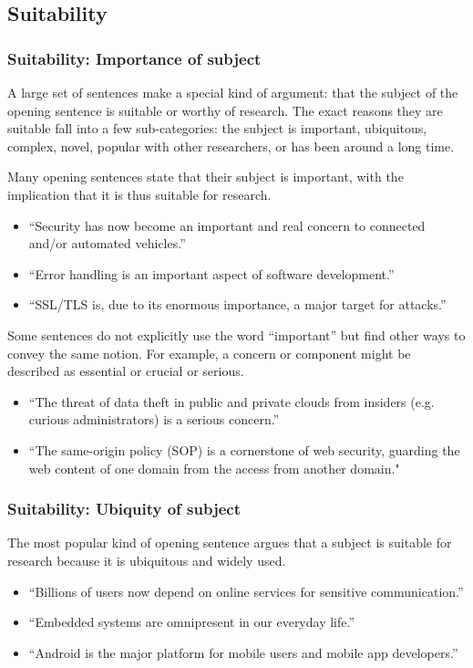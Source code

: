 \documentclass[sigconf,anonymous]{acmart}
\begin{document}
	
	\subsection{Suitability}
	\subsubsection{Suitability: Importance of subject}
	
	A large set of sentences make a special kind of argument: that the subject of the opening sentence is suitable or worthy of research. The exact reasons they are suitable fall into a few sub-categories: the subject is important, ubiquitous, complex, novel, popular with other researchers, or has been around a long time. 
	
	Many opening sentences state that their subject is important, with the implication that it is thus suitable for research.
	\begin{itemize}
		\item 	``Security has now become an important and real concern to connected and/or automated vehicles.''
		
		\item 	``Error handling is an important aspect of software development.''
		
		\item 	``SSL/TLS is, due to its enormous importance, a major target for attacks.''
	\end{itemize}
	
	
	Some sentences do not explicitly use the word “important” but find other ways to convey the same notion. For example, a concern or component might be described as essential or crucial or serious.
	\begin{itemize}
		\item 	``The threat of data theft in public and private clouds from insiders (e.g. curious administrators) is a serious concern.''
		
		\item 	``The same-origin policy (SOP) is a cornerstone of web security, guarding the web content of one domain from the access from another domain."
	\end{itemize}
	
	
	\subsubsection{Suitability: Ubiquity of subject}
	
	The most popular kind of opening sentence argues that a subject is suitable for research because it is ubiquitous and widely used.
	\begin{itemize}
		\item ``Billions of users now depend on online services for sensitive communication.''
		
		\item	``Embedded systems are omnipresent in our everyday life.''
		
		\item	``Android is the major platform for mobile users and mobile app developers.''
	\end{itemize}
	
\end{document}
